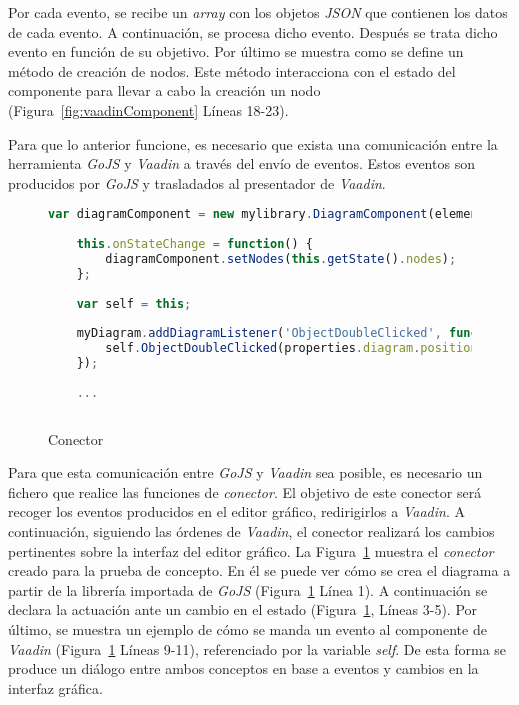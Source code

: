 
Por cada evento, se recibe un \emph{array} con los objetos \emph{JSON} que contienen los datos de cada evento. A continuación, se procesa dicho evento. Después se trata dicho evento en función de su objetivo. 
Por último se muestra como se define un método de creación de nodos. Este método interacciona con el estado del componente para llevar a cabo la creación un nodo (Figura~\ref{fig:vaadinComponent} Líneas 18-23).

Para que lo anterior funcione, es necesario que exista una comunicación entre la herramienta \emph{GoJS} y \emph{Vaadin} a través del envío de eventos. Estos eventos son producidos por \emph{GoJS} y trasladados al presentador de \emph{Vaadin}.

\begin{figure}[H]
	\centering
	\begin{lstlisting}[language=Javascript]
	var diagramComponent = new mylibrary.DiagramComponent(element);
	
	this.onStateChange = function() {
		diagramComponent.setNodes(this.getState().nodes);
	};
	
	var self = this;
	
	myDiagram.addDiagramListener('ObjectDoubleClicked', function(properties) {
		self.ObjectDoubleClicked(properties.diagram.position);
	});
	
	...
	
	\end{lstlisting}
	\caption{Conector}
	\label{fig:connector}
\end{figure}

Para que esta comunicación entre \emph{GoJS} y \emph{Vaadin} sea posible, es necesario un fichero que realice las funciones de \emph{conector}. El objetivo de este conector será recoger los eventos producidos en el editor gráfico, redirigirlos a \emph{Vaadin}. A continuación, siguiendo las órdenes de \emph{Vaadin}, el conector realizará los cambios pertinentes sobre la interfaz del editor gráfico. La Figura~\ref{fig:connector} muestra el \emph{conector} creado para la prueba de concepto. En él se puede ver cómo se crea el diagrama a partir de la librería importada de \emph{GoJS} (Figura~\ref{fig:connector} Línea 1). A continuación se declara la actuación ante un cambio en el estado (Figura~\ref{fig:connector}, Líneas 3-5). Por último, se muestra un ejemplo de cómo se manda un evento al componente de \emph{Vaadin} (Figura~\ref{fig:connector} Líneas 9-11), referenciado por la variable \emph{self}. De esta forma se produce un diálogo entre ambos conceptos en base a eventos y cambios en la interfaz gráfica.

